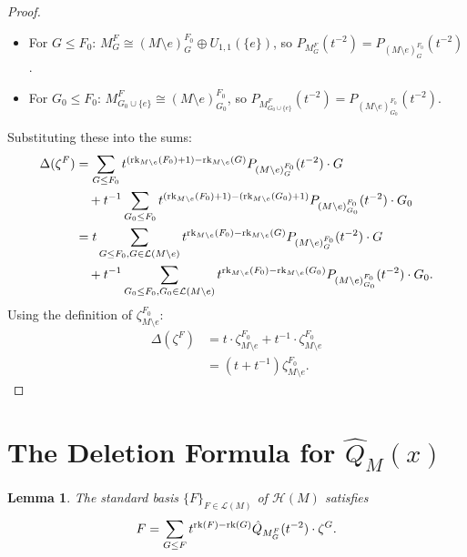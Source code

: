 \documentclass[10pt]{article}
\newcommand{\calL}{\mathcal{L}}
\newcommand{\calH}{\mathcal{H}}
\newcommand{\rank}{\normalfont\text{rk}}
\newtheorem{lemma}[theorem]{Lemma}
\theoremstyle{remark}
\begin{document}
\begin{proof}
\begin{itemize}
    \item For $G \leq F_0$: $M_G^F \cong (M\setminus e)_G^{F_0} \oplus U_{1,1}(\{e\})$, so $P_{M_G^F}(t^{-2}) = P_{(M\setminus e)_G^{F_0}}(t^{-2})$.
    \item For $G_0 \leq F_0$: $M_{G_0 \cup \{e\}}^{F} \cong (M\setminus e)_{G_0}^{F_0}$, so $P_{M_{G_0 \cup \{e\}}^{F}}(t^{-2}) = P_{(M\setminus e)_{G_0}^{F_0}}(t^{-2})$.
\end{itemize}
Substituting these into the sums:
\begin{align*}
\Delta(\zeta^F) &= \sum_{G \leq F_0} t^{(\rank_{M\setminus e}(F_0) + 1) - \rank_{M\setminus e}(G)} P_{(M\setminus e)_G^{F_0}}(t^{-2}) \cdot G \\
&\quad + t^{-1} \sum_{G_0 \leq F_0} t^{(\rank_{M\setminus e}(F_0) + 1) - (\rank_{M\setminus e}(G_0) + 1)} P_{(M\setminus e)_{G_0}^{F_0}}(t^{-2}) \cdot G_0 \\
&= t \sum_{G \leq F_0, G \in \calL(M\setminus e)} t^{\rank_{M\setminus e}(F_0) - \rank_{M\setminus e}(G)} P_{(M\setminus e)_G^{F_0}}(t^{-2}) \cdot G \\
&\quad + t^{-1} \sum_{G_0 \leq F_0, G_0 \in \calL(M\setminus e)} t^{\rank_{M\setminus e}(F_0) - \rank_{M\setminus e}(G_0)} P_{(M\setminus e)_{G_0}^{F_0}}(t^{-2}) \cdot G_0.
\end{align*}
Using the definition of $\zeta^{F_0}_{M\setminus e}$:
\begin{align*}
\Delta(\zeta^F) &= t \cdot \zeta^{F_0}_{M\setminus e} + t^{-1} \cdot \zeta^{F_0}_{M\setminus e} \\
&= (t + t^{-1})\zeta^{F_0}_{M\setminus e}.
\end{align*}
\end{proof}

\section{The Deletion Formula for $\hat{Q}_M(x)$}
\label{sec:deletion_formula}

\begin{lemma}
\label{lem:standard_basis_in_zeta}
    The standard basis $\{F\}_{F \in \calL(M)}$ of $\calH(M)$ satisfies
    \begin{equation}
    \label{cob-lemma}
        F = \sum_{G \leq F} t^{\rank(F) - \rank(G)} \hat{Q}_{M_G^F}(t^{-2}) \cdot \zeta^G.
    \end{equation}
\end{lemma}
\end{document}
